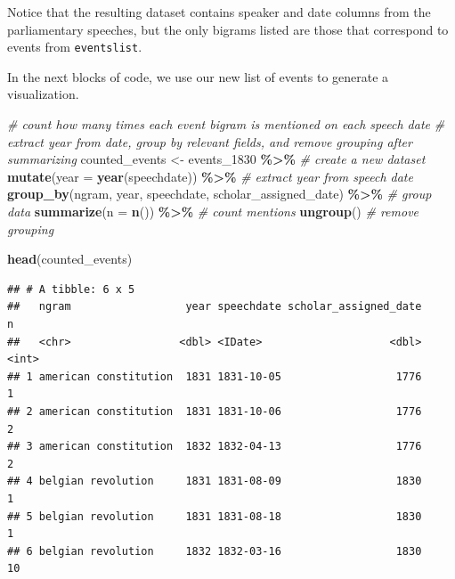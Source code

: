 \documentclass[
]{article}
\newenvironment{Shaded}{\begin{snugshade}}{\end{snugshade}}
\newcommand{\AttributeTok}[1]{\textcolor[rgb]{0.13,0.29,0.53}{#1}}
\newcommand{\CommentTok}[1]{\textcolor[rgb]{0.56,0.35,0.01}{\textit{#1}}}
\newcommand{\FunctionTok}[1]{\textcolor[rgb]{0.13,0.29,0.53}{\textbf{#1}}}
\newcommand{\NormalTok}[1]{#1}
\newcommand{\OtherTok}[1]{\textcolor[rgb]{0.56,0.35,0.01}{#1}}
\newcommand{\SpecialCharTok}[1]{\textcolor[rgb]{0.81,0.36,0.00}{\textbf{#1}}}
\begin{document}
Notice that the resulting dataset contains speaker and date columns from
the parliamentary speeches, but the only bigrams listed are those that
correspond to events from \texttt{eventslist}.

In the next blocks of code, we use our new list of events to generate a
visualization.

\begin{Shaded}
\begin{Highlighting}[]
\CommentTok{\# count how many times each event bigram is mentioned on each speech date}
\CommentTok{\# extract year from date, group by relevant fields, and remove grouping after summarizing}
\NormalTok{counted\_events }\OtherTok{\textless{}{-}}\NormalTok{ events\_1830 }\SpecialCharTok{\%\textgreater{}\%} \CommentTok{\# create a new dataset}
  \FunctionTok{mutate}\NormalTok{(}\AttributeTok{year =} \FunctionTok{year}\NormalTok{(speechdate)) }\SpecialCharTok{\%\textgreater{}\%} \CommentTok{\# extract year from speech date}
  \FunctionTok{group\_by}\NormalTok{(ngram, year, speechdate, scholar\_assigned\_date) }\SpecialCharTok{\%\textgreater{}\%} \CommentTok{\# group data}
  \FunctionTok{summarize}\NormalTok{(}\AttributeTok{n =} \FunctionTok{n}\NormalTok{()) }\SpecialCharTok{\%\textgreater{}\%} \CommentTok{\# count mentions}
  \FunctionTok{ungroup}\NormalTok{() }\CommentTok{\# remove grouping}

\FunctionTok{head}\NormalTok{(counted\_events)}
\end{Highlighting}
\end{Shaded}

\begin{verbatim}
## # A tibble: 6 x 5
##   ngram                  year speechdate scholar_assigned_date     n
##   <chr>                 <dbl> <IDate>                    <dbl> <int>
## 1 american constitution  1831 1831-10-05                  1776     1
## 2 american constitution  1831 1831-10-06                  1776     2
## 3 american constitution  1832 1832-04-13                  1776     2
## 4 belgian revolution     1831 1831-08-09                  1830     1
## 5 belgian revolution     1831 1831-08-18                  1830     1
## 6 belgian revolution     1832 1832-03-16                  1830    10
\end{verbatim}
\end{document}

